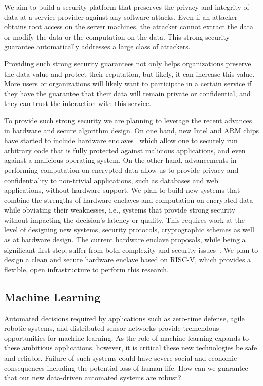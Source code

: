 We aim to build a security platform that preserves the privacy and integrity of data at a service provider against any software attacks. Even if an attacker obtains root access on the server machines, the attacker cannot extract the data or modify the data or the computation on the data. This strong security guarantee automatically addresses a large class of attackers.

Providing such strong security guarantees not only helps organizations preserve the data value and protect their reputation, but likely, it can increase this value. More users or organizations will likely want to participate in a certain service if they have the guarantee that their data will remain private or confidential, and they can trust the interaction with this service.
                                               
To provide such strong security we are planning to leverage the recent advances in hardware and secure algorithm design. On one hand, new Intel and ARM chips have started to include hardware enclaves~\cite{IntelSGX} which allow one to securely run arbitrary code that is fully protected against malicious applications, and even against a malicious operating system.  On the other hand, advancements in performing computation on encrypted data allow us to provide privacy and confidentiality to non-trivial applications, such as databases and web applications, without hardware support. 
We plan to build new systems that combine the strengths of hardware enclaves and computation  on encrypted data while obviating their weaknesses, i.e., systems that provide strong security without impacting the decision's latency or quality. This requires work at the level of designing new systems, security protocols, cryptographic schemes as well as at hardware design. The current hardware enclave proposals, while being a significant first step, suffer from both complexity and security issues~\cite{SGXcostandevadas}. We plan to design a clean and secure hardware enclave based on RISC-V, which provides a flexible, open infrastructure to perform this research. 


\subsection{Machine Learning} 

Automated decisions required by applications such as zero-time defense, agile robotic systems, and distributed sensor networks provide tremendous opportunities for machine learning. As the role of machine learning expands to these ambitious applications, however, it is critical these new technologies be safe and reliable.  Failure of such systems could have severe social and economic consequences including the potential loss of human life. How can we guarantee that our new data-driven automated systems are robust?


